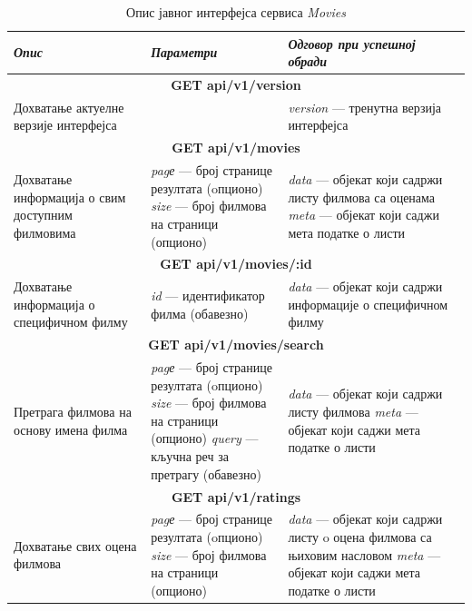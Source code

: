 \documentclass[12pt,oneside]{memoir}
\begin{document}
\begin{table}
\caption{Опис јавног интерфејса сервиса  \textit{Movies} }
\label{tbl:moviesAPI}
\begin{center}
\begin{tabular}{ |  p{0.3\linewidth} | p{0.3\linewidth}|  p{0.4\linewidth} | }
 
 \hline
  \textit{Опис} & \textit{Параметри} & \textit{Одговор при успешној обради} \\
  \hline
  \multicolumn{3}{|c|}{\textbf{GET api/v1/version}} \\
  \hline
  Дохватање актуелне верзије интерфејса
  & 
  
  & 
 \textit{version} --- тренутна верзија интерфејса \\
  \hline
 \multicolumn{3}{|c|}{\textbf{GET api/v1/movies}} \\
  \hline
  Дохватање информација о свим доступним филмовима
  & 
  \textit{pagе} --- број странице резултата (oпционо) \newline 
  \textit{size} --- број филмова на страници (опционо)
  & 
  \textit{data} --- објекат који садржи листу филмова са оценама \newline  
  \textit{meta} --- објекат који саджи мета податке о листи \\
  \hline
   \multicolumn{3}{|c|}{\textbf{GET api/v1/movies/:id}} \\
  \hline
  Дохватање информација о специфичном филму 
  & 
  \textit{id} --- идентификатор филма (обавезно)
  & 
  \textit{data} --- објекат који садржи информације о специфичном филму\\
  \hline
   \multicolumn{3}{|c|}{\textbf{GET api/v1/movies/search}} \\
  \hline
  Претрага филмова на основу имена филма
  & 
  \textit{pagе} --- број странице резултата (oпционо) \newline 
  \textit{size} --- број филмова на страници (опционо) \newline 
  \textit{query} --- кључна реч за претрагу (обавезно)
  & 
  \textit{data} --- објекат који садржи листу филмова \newline  
  \textit{meta} --- објекат који саджи мета податке о листи \\
   \hline
     \multicolumn{3}{|c|}{\textbf{GET api/v1/ratings}} \\
  \hline
 Дохватање свих оцена филмова
  & 
  \textit{pagе} --- број странице резултата (oпционо) \newline 
  \textit{size} --- број филмова на страници (опционо)
  & 
  \textit{data} --- објекат који садржи листу o оцена филмова са њиховим насловом \newline 
  \textit{meta} --- објекат који саджи мета податке о листи \\ 
  \hline
\end{tabular}
\end{center}
\end{table}
\end{document}
